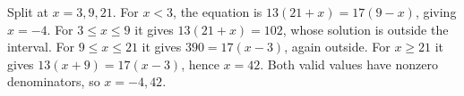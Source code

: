 Split at $x=3,9,21$. For $x<3$, the equation is $13(21+x)=17(9-x)$, giving $x=-4$. For $3\le x\le9$ it gives $13(21+x)=102$, whose solution is outside the interval. For $9\le x\le21$ it gives $390=17(x-3)$, again outside. For $x\ge21$ it gives $13(x+9)=17(x-3)$, hence $x=42$. Both valid values have nonzero denominators, so $\boxed{x=-4,42}$.
